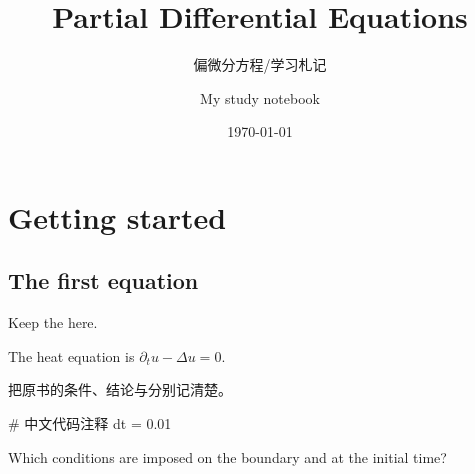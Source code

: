 \documentclass[cover=pde]{lumenbook}
\title{Partial Differential Equations}
\subtitle{偏微分方程\enspace /\enspace 学习札记}
\author{My study notebook}
\date{\today}
\begin{document}
\frontmatter
\maketitle
\tableofcontents
\mainmatter
\chapter{Getting started}
\section{The first equation}
Keep the  here.
\begin{definition}\label{def:model}
The heat equation is $\partial_t u-\Delta u=0$.
\end{definition}
\begin{translationbox}
把原书的条件、结论与分别记清楚。
\end{translationbox}
\begin{margincode}[language=Python]
# 中文代码注释
dt = 0.01
\end{margincode}
\begin{exercise}
Which conditions are imposed on the boundary and at the initial time?
\end{exercise}
\end{document}
